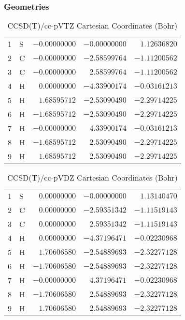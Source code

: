\documentclass[10pt,oneside]{article}
\begin{document}
\clearpage

\subsection{\ \ \ }

\subsubsection*{Geometries}
\begin{table}[h!]
\centering
\caption{CCSD(T)/cc-pVTZ Cartesian Coordinates (Bohr)}
\begin{tabular}{llrrr}
1  & S  & $-0.00000000$ & $-0.00000000$ & $ 1.12636820$ \\
2  & C  & $-0.00000000$ & $-2.58599764$ & $-1.11200562$ \\
3  & C  & $-0.00000000$ & $ 2.58599764$ & $-1.11200562$ \\
4  & H  & $ 0.00000000$ & $-4.33900174$ & $-0.03161213$ \\
5  & H  & $ 1.68595712$ & $-2.53090490$ & $-2.29714225$ \\
6  & H  & $-1.68595712$ & $-2.53090490$ & $-2.29714225$ \\
7  & H  & $-0.00000000$ & $ 4.33900174$ & $-0.03161213$ \\
8  & H  & $-1.68595712$ & $ 2.53090490$ & $-2.29714225$ \\
9  & H  & $ 1.68595712$ & $ 2.53090490$ & $-2.29714225$ \\
\end{tabular}
\end{table}

\begin{table}[h!]
\centering
\caption{CCSD(T)/cc-pVDZ Cartesian Coordinates (Bohr)}
\begin{tabular}{llrrr}
1  & S  & $ 0.00000000$ & $-0.00000000$ & $ 1.13140470$ \\
2  & C  & $ 0.00000000$ & $-2.59351342$ & $-1.11519143$ \\
3  & C  & $ 0.00000000$ & $ 2.59351342$ & $-1.11519143$ \\
4  & H  & $ 0.00000000$ & $-4.37196471$ & $-0.02230968$ \\
5  & H  & $ 1.70606580$ & $-2.54889693$ & $-2.32277128$ \\
6  & H  & $-1.70606580$ & $-2.54889693$ & $-2.32277128$ \\
7  & H  & $-0.00000000$ & $ 4.37196471$ & $-0.02230968$ \\
8  & H  & $-1.70606580$ & $ 2.54889693$ & $-2.32277128$ \\
9  & H  & $ 1.70606580$ & $ 2.54889693$ & $-2.32277128$ \\
\end{tabular}
\end{table}
\end{document}
